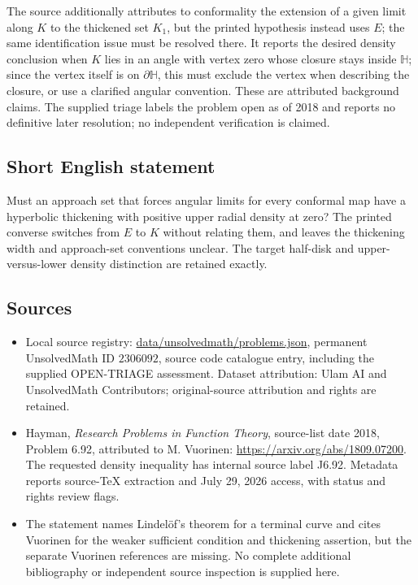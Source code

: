 \documentclass[11pt]{article}
\begin{document}
The source additionally attributes to conformality the extension of a given limit along $K$ to the thickened set $K_1$, but the printed hypothesis instead uses $E$; the same identification issue must be resolved there. It reports the desired density conclusion when $K$ lies in an angle with vertex zero whose closure stays inside $\mathbb H$; since the vertex itself is on $\partial\mathbb H$, this must exclude the vertex when describing the closure, or use a clarified angular convention. These are attributed background claims. The supplied triage labels the problem open as of 2018 and reports no definitive later resolution; no independent verification is claimed.
\subsection{Short English statement}
Must an approach set that forces angular limits for every conformal map have a hyperbolic thickening with positive upper radial density at zero? The printed converse switches from $E$ to $K$ without relating them, and leaves the thickening width and approach-set conventions unclear. The target half-disk and upper-versus-lower density distinction are retained exactly.
\subsection{Sources}
\begin{itemize}
\item Local source registry: \url{data/unsolvedmath/problems.json}, permanent UnsolvedMath ID $2306092$, source code catalogue entry, including the supplied OPEN-TRIAGE assessment. Dataset attribution: Ulam AI and UnsolvedMath Contributors; original-source attribution and rights are retained.
\item Hayman, \emph{Research Problems in Function Theory}, source-list date 2018, Problem 6.92, attributed to M. Vuorinen: \url{https://arxiv.org/abs/1809.07200}. The requested density inequality has internal source label J6.92. Metadata reports source-TeX extraction and July 29, 2026 access, with status and rights review flags.
\item The statement names Lindel\"of's theorem for a terminal curve and cites Vuorinen for the weaker sufficient condition and thickening assertion, but the separate Vuorinen references are missing. No complete additional bibliography or independent source inspection is supplied here.
\end{itemize}
\end{document}
